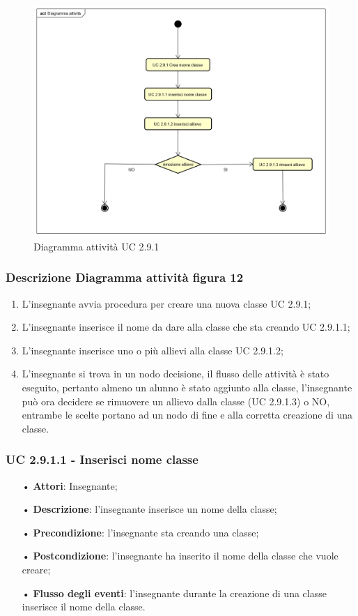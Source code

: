 \begin{figure}[H]
	\centering
\includegraphics[width=17cm]{img/Diagramma_attivita_crea_classe.png} 
	\caption{Diagramma attività UC 2.9.1}
\end{figure}

\subsubsection{Descrizione Diagramma attività figura 12}
\begin{enumerate}
		\item L'insegnante avvia procedura per creare una nuova classe UC 2.9.1; 
		\item L'insegnante inserisce il nome da dare alla classe che sta creando UC 2.9.1.1; 
		\item L'insegnante inserisce uno o più allievi alla classe UC 2.9.1.2; 
		\item L'insegnante si trova in un nodo decisione, il flusso delle attività è stato eseguito, pertanto almeno un alunno è stato aggiunto alla classe, l'insegnante può ora decidere se rimuovere un allievo dalla classe (UC 2.9.1.3) o NO, entrambe le scelte portano ad un nodo di fine e alla corretta creazione di una classe. 
	\end{enumerate}


\subsubsection{UC 2.9.1.1 - Inserisci nome classe}
\begin{itemize}
	\item[•] \textbf{Attori}: Insegnante;
	\item[•] \textbf{Descrizione}: l'insegnante inserisce un nome della classe;
	\item[•] \textbf{Precondizione}: l'insegnante sta creando una classe;
	\item[•] \textbf{Postcondizione}: l'insegnante ha inserito il nome della classe che vuole creare;
	\item[•] \textbf{Flusso degli eventi}: l'insegnante durante la creazione di una classe inserisce il nome della classe.
\end{itemize}

